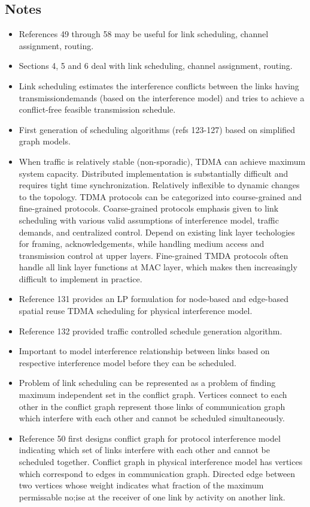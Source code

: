\documentclass{article}
\begin{document}
\subsection{Notes}
\begin{itemize}
    \item References 49 through 58 may be useful for link scheduling, channel assignment, routing.
    \item Sections 4, 5 and 6 deal with link scheduling, channel assignment, routing.
    \item Link scheduling estimates the interference conflicts between the links having transmissiondemands (based on the interference model) and tries to achieve a conflict-free feasible transmission schedule.
    \item First generation of scheduling algorithms (refs 123-127) based on simplified graph models.
    \item When traffic is relatively stable (non-sporadic), TDMA can achieve maximum system capacity.  Distributed implementation is substantially difficult and requires tight time synchronization.  Relatively inflexible to dynamic changes to the topology.  TDMA protocols can be categorized into course-grained and fine-grained protocols.  Coarse-grained protocols emphasis given to link scheduling with various valid assumptions of interference model, traffic demands, and centralized control.  Depend on existing link layer techologies for framing, acknowledgements, while handling medium access and transmission control at upper layers.  Fine-grained TMDA protocols often handle all link layer functions at MAC layer, which makes then increasingly difficult to implement in practice.
    \item Reference 131 provides an LP formulation for node-based and edge-based spatial reuse TDMA scheduling for physical interference model.
    \item Reference 132 provided traffic controlled schedule generation algorithm.
    \item Important to model interference relationship between links based on respective interference model before they can be scheduled.
    \item Problem of link scheduling can be represented as a problem of finding maximum independent set in the conflict graph.  Vertices connect to each other in the conflict graph represent those links of communication graph which interfere with each other and cannot be scheduled simultaneously.
    \item Reference 50 first designs conflict graph for protocol interference model indicating which set of links interfere with each other and cannot be scheduled together.  Conflict graph in physical interference model has vertices which correspond to edges in communication graph.  Directed edge between two vertices whose weight indicates what fraction of the maximum permissable no;ise at the receiver of one link by activity on another link.

\end{itemize}
\end{document}
